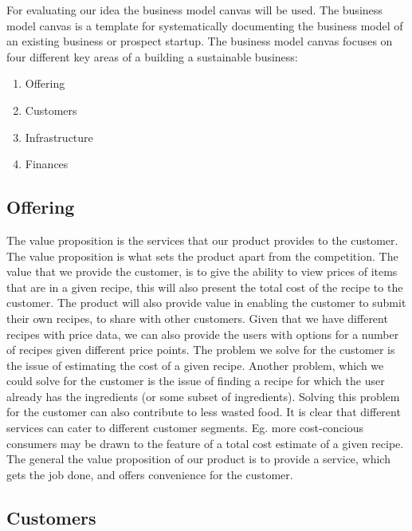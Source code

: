 \documentclass{article}
\begin{document}
For evaluating our idea the business model canvas will be used. The business model canvas
is a template for systematically documenting the business model of an existing business or
prospect startup. The business model canvas focuses on four different key areas of a
building a sustainable business: \begin{enumerate}[itemsep=0pt]
  \item Offering
  \item Customers
  \item Infrastructure
  \item Finances
\end{enumerate}

\subsection{Offering}
The value proposition is the services that our
product provides to the customer. The value proposition is what sets the product apart from the
competition. The value that we provide the customer, is to give the ability to view
prices of items that are in a given recipe, this will also present the total cost of the
recipe to the customer. The product will also provide value in enabling the customer to
submit their own recipes, to share with other customers. Given that we have different
recipes with price data, we can also provide the users with options for a number of
recipes given different price points. The problem we solve for the customer is the
issue of estimating the cost of a given recipe.  Another problem, which we could solve for
the customer is the issue of finding a recipe for which the user already has the
ingredients (or some subset of ingredients). Solving this problem for the customer can
also contribute to less wasted food. It is clear that different services can cater to
different customer segments.  Eg. more cost-concious consumers may be drawn to the feature
of a total cost estimate of a given recipe. The general the value proposition of our
product is to provide a service, which gets the job done, and offers convenience for the
customer. 


\subsection{Customers}
\end{document}

